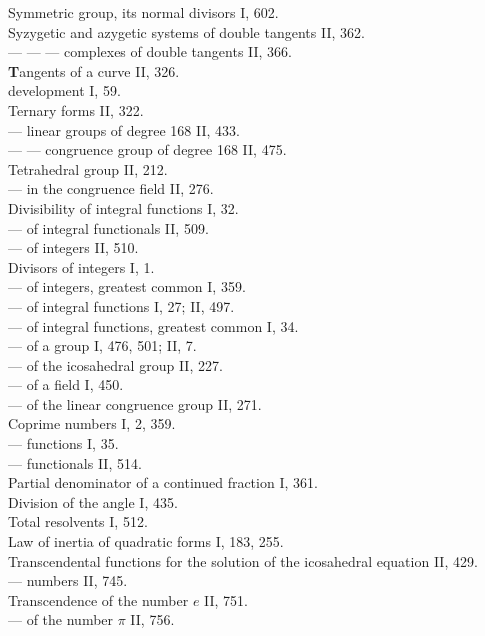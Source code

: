 \begin{flushleft}
Symmetric group, its normal divisors I, 602. \\
Syzygetic and azygetic systems of double tangents II, 362. \\
— — — complexes of double tangents II, 366. \\[6pt]
\textbf{T}angents of a curve II, 326. \\
 development I, 59. \\
Ternary forms II, 322. \\
— linear groups of degree 168 II, 433. \\
— — congruence group of degree 168 II, 475. \\
Tetrahedral group II, 212. \\
— in the congruence field II, 276. \\
Divisibility of integral functions I, 32. \\
— of integral functionals II, 509. \\
— of integers II, 510. \\
Divisors of integers I, 1. \\
— of integers, greatest common I, 359. \\
— of integral functions I, 27; II, 497. \\
— of integral functions, greatest common I, 34. \\
— of a group I, 476, 501; II, 7. \\
— of the icosahedral group II, 227. \\
— of a field I, 450. \\
— of the linear congruence group II, 271. \\
Coprime numbers I, 2, 359. \\
— functions I, 35. \\
— functionals II, 514. \\
Partial denominator of a continued fraction I, 361. \\
Division of the angle I, 435. \\
Total resolvents I, 512. \\
Law of inertia of quadratic forms I, 183, 255. \\
Transcendental functions for the solution of the icosahedral equation II, 429. \\
— numbers II, 745. \\
Transcendence of the number $e$ II, 751. \\
— of the number $\pi$ II, 756. \\

\end{flushleft}

